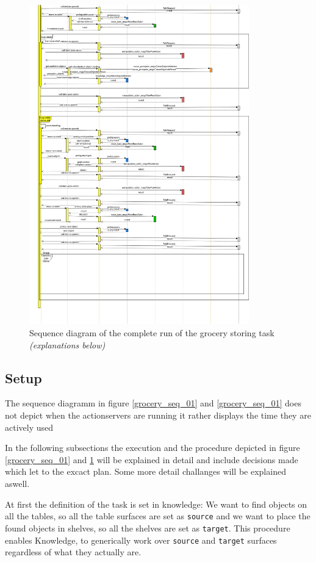 \documentclass[main.tex]{subfiles}
\begin{document}
		\begin{figure}	
			\centering
			\includegraphics[width=0.85\textwidth]{pictures/diagramms/second-part-grocery-sequence.png}
			\caption{Sequence diagram of the complete run of the grocery storing task \textit{(explanations below)}}
			\label{grocery_seq_02}
		\end{figure}
	
	\subsection{Setup}
		The sequence diagramm in figure \ref{grocery_seq_01} and \ref{grocery_seq_01} does not depict when the actionservers are running it rather displays the time they are actively used	
	
	In the following subsections the execution and the procedure depicted in figure \ref{grocery_seq_01} and \ref{grocery_seq_02} will be explained in detail and include decisions made which let to the excact plan. Some more detail challanges will be explained aswell.

	At first the definition of the task is set in knowledge: We want to find objects on all the tables, so all the table surfaces are set as \texttt{source} and we want to place the found objects in shelves, so all the shelves are set as \texttt{target}. This procedure enables Knowledge, to generically work over \texttt{source} and \texttt{target} surfaces regardless of what they actually are.
	
\end{document}
